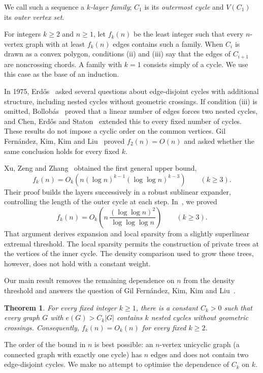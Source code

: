 \documentclass[10pt,letterpaper]{article}
\newtheorem{theorem}{Theorem}[section]
\theoremstyle{definition}
\theoremstyle{remark}
\begin{document}
We call such a sequence a \emph{$k$-layer family}; $C_1$ is its \emph{outermost cycle} and $V(C_1)$ its \emph{outer vertex set}.

For integers $k\ge2$ and $n\ge1$, let $f_k(n)$ be the least integer such that every $n$-vertex graph with at least $f_k(n)$ edges contains such a family. When $C_i$ is drawn as a convex polygon, conditions (ii) and (iii) say that the edges of $C_{i+1}$ are noncrossing chords. A family with $k=1$ consists simply of a cycle. We use this case as the base of an induction.

In 1975, Erd\H{o}s~\cite{Erdos} asked several questions about edge-disjoint cycles with additional structure, including nested cycles without geometric crossings. If condition (iii) is omitted, Bollob\'as~\cite{Bollobas} proved that a linear number of edges forces two nested cycles, and Chen, Erd\H{o}s and Staton~\cite{CES} extended this to every fixed number of cycles. These results do not impose a cyclic order on the common vertices. Gil Fern\'andez, Kim, Kim and Liu~\cite{GKKL} proved $f_2(n)=O(n)$ and asked whether the same conclusion holds for every fixed $k$.

Xu, Zeng and Zhang~\cite{XZZ} obtained the first general upper bound,
\[
f_k(n)=O_k\!\left(n(\log n)^{k-1}(\log\log n)^{k-3}\right)
\qquad(k\ge3).
\]
Their proof builds the layers successively in a robust sublinear expander, controlling the length of the outer cycle at each step. In~\cite{AGH}, we proved
\[
f_k(n)=O_k\!\left(n\,\frac{(\log\log n)^2}{\log\log\log n}\right)
\qquad(k\ge3).
\]
That argument derives expansion and local sparsity from a slightly superlinear extremal threshold. The local sparsity permits the construction of private trees at the vertices of the inner cycle. The density comparison used to grow these trees, however, does not hold with a constant weight.

Our main result removes the remaining dependence on $n$ from the density threshold and answers the question of Gil Fern\'andez, Kim, Kim and Liu~\cite[Question 1.2]{GKKL}.

\begin{theorem}\label{thm:main}
For every fixed integer $k\ge1$, there is a constant $C_k>0$ such that every graph $G$ with $e(G)>C_k|G|$ contains $k$ nested cycles without geometric crossings. Consequently, $f_k(n)=O_k(n)$ for every fixed $k\ge2$.
\end{theorem}

The order of the bound in $n$ is best possible: an $n$-vertex unicyclic graph (a connected graph with exactly one cycle) has $n$ edges and does not contain two edge-disjoint cycles. We make no attempt to optimise the dependence of $C_k$ on $k$.
\end{document}
